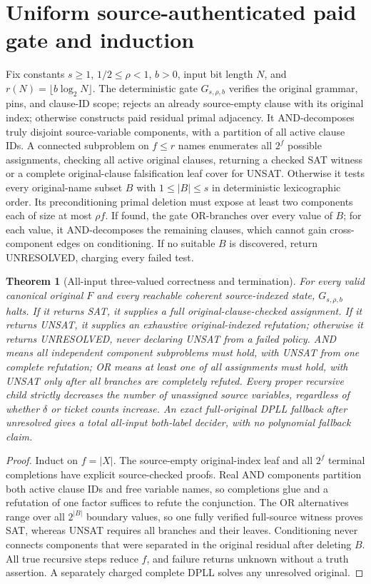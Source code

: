 \documentclass[11pt]{article}
\newtheorem{theorem}{Theorem}
\begin{document}
\section{Uniform source-authenticated paid gate and induction}
Fix constants $s\ge1$, $1/2\le\rho<1$, $b>0$, input bit length $N$, and $r(N)=\lfloor b\log_2N\rfloor$. The deterministic gate $G_{s,\rho,b}$ verifies the original grammar, pins, and clause-ID scope; rejects an already source-empty clause with its original index; otherwise constructs paid residual primal adjacency. It AND-decomposes truly disjoint source-variable components, with a partition of all active clause IDs. A connected subproblem on $f\le r$ names enumerates all $2^f$ possible assignments, checking all active original clauses, returning a checked SAT witness or a complete original-clause falsification leaf cover for UNSAT. Otherwise it tests every original-name subset $B$ with $1\le|B|\le s$ in deterministic lexicographic order. Its preconditioning primal deletion must expose at least two components each of size at most $\rho f$. If found, the gate OR-branches over every value of $B$; for each value, it AND-decomposes the remaining clauses, which cannot gain cross-component edges on conditioning. If no suitable $B$ is discovered, return UNRESOLVED, charging every failed test.

\begin{theorem}[All-input three-valued correctness and termination]
For every valid canonical original $F$ and every reachable coherent source-indexed state, $G_{s,\rho,b}$ halts. If it returns SAT, it supplies a full original-clause-checked assignment. If it returns UNSAT, it supplies an exhaustive original-indexed refutation; otherwise it returns UNRESOLVED, never declaring UNSAT from a failed policy. AND means all independent component subproblems must hold, with UNSAT from one complete refutation; OR means at least one of \emph{all} assignments must hold, with UNSAT only after all branches are completely refuted. Every proper recursive child strictly decreases the number of unassigned source variables, regardless of whether $\delta$ or ticket counts increase. An exact full-original DPLL fallback after unresolved gives a total all-input both-label decider, with no polynomial fallback claim.
\end{theorem}
\begin{proof}
Induct on $f=|X|$. The source-empty original-index leaf and all $2^f$ terminal completions have explicit source-checked proofs. Real AND components partition both active clause IDs and free variable names, so completions glue and a refutation of one factor suffices to refute the conjunction. The OR alternatives range over all $2^{|B|}$ boundary values, so one fully verified full-source witness proves SAT, whereas UNSAT requires all branches and their leaves. Conditioning never connects components that were separated in the original residual after deleting $B$. All true recursive steps reduce $f$, and failure returns unknown without a truth assertion. A separately charged complete DPLL solves any unresolved original. \end{proof}
\end{document}
